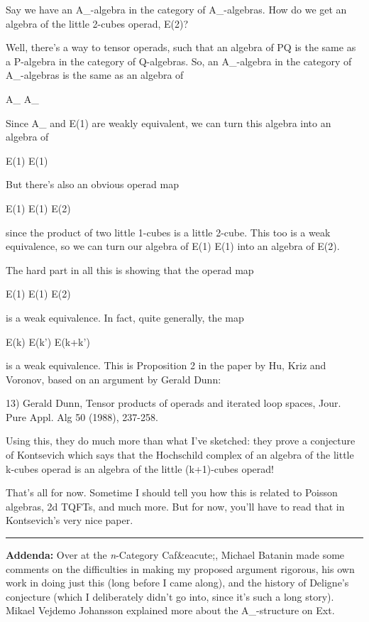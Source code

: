 Say we have an A_{\infty }-algebra in the category of A_{\infty }-algebras.  How do we get an algebra of the little 2-cubes operad,
E(2)?

Well, there's a way to tensor operads, such that an algebra of P\otimes Q 
is the same as a P-algebra in the category of Q-algebras.  So, an 
A_{\infty }-algebra in the category of A_{\infty }-algebras is
the same as an algebra of

A_{\infty } \otimes  A_{\infty }

Since A_{\infty } and E(1) are weakly equivalent, we can turn this
algebra into an algebra of 

E(1) \otimes  E(1)

But there's also an obvious operad map

E(1) \otimes  E(1) \to  E(2)

since the product of two little 1-cubes is a little 2-cube.
This too is a weak equivalence, so we can turn our algebra of
E(1) \otimes  E(1) into an algebra of E(2).

The hard part in all this is showing that the operad map

E(1) \otimes  E(1) \to  E(2)

is a weak equivalence.  In fact, quite generally, the map

E(k) \otimes  E(k') \to  E(k+k') 

is a weak equivalence.  This is Proposition 2 in the paper by
Hu, Kriz and Voronov, based on an argument by Gerald Dunn:

13) Gerald Dunn, Tensor products of operads and iterated loop
spaces, Jour. Pure Appl. Alg 50 (1988), 237-258.

Using this, they do much more than what I've sketched: they
prove a conjecture of Kontsevich which says that the Hochschild 
complex of an algebra of the little k-cubes
operad is an algebra of the little (k+1)-cubes operad!

That's all for now.  Sometime I should tell you how this is related
to Poisson algebras, 2d TQFTs, and much more.  But for now, you'll
have to read that in Kontsevich's very nice paper.

\par\noindent\rule{\textwidth}{0.4pt}

\textbf{Addenda:} 
Over at the \emph{n}-Category Caf&eacute;, 
Michael Batanin made some comments on the
difficulties in making my proposed argument rigorous, his own work in
doing just this (long before I came along), and the history of Deligne's
conjecture (which I deliberately didn't go into, since it's such a
long story).  Mikael Vejdemo Johansson explained more about the
A_{\infty }-structure on Ext.

